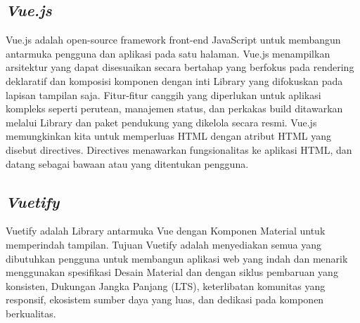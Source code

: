 \subsection{\emph{Vue.js}}
\vspace{1ex}
Vue.js adalah open-source framework front-end JavaScript untuk membangun antarmuka
pengguna dan aplikasi pada satu halaman.
Vue.js menampilkan arsitektur yang dapat disesuaikan secara bertahap yang berfokus pada rendering deklaratif dan
komposisi komponen dengan inti Library yang difokuskan pada lapisan tampilan saja. Fitur-fitur canggih yang
diperlukan untuk aplikasi kompleks seperti perutean, manajemen status, dan perkakas build ditawarkan melalui
Library dan paket pendukung yang dikelola secara resmi.
Vue.js memungkinkan kita untuk memperluas HTML dengan atribut HTML yang disebut directives. Directives menawarkan
fungsionalitas ke aplikasi HTML, dan datang sebagai bawaan atau yang ditentukan pengguna.
\vspace{0.5ex}

\subsection{\emph{Vuetify}}
\vspace{1ex}
Vuetify adalah Library antarmuka Vue dengan Komponen Material untuk memperindah tampilan.
Tujuan Vuetify adalah menyediakan semua yang dibutuhkan pengguna untuk membangun aplikasi web yang indah dan
menarik menggunakan spesifikasi Desain Material dan dengan siklus pembaruan yang konsisten,
Dukungan Jangka Panjang (LTS), keterlibatan komunitas yang responsif, ekosistem sumber daya yang luas,
dan dedikasi pada komponen berkualitas.
\vspace{0.5ex}